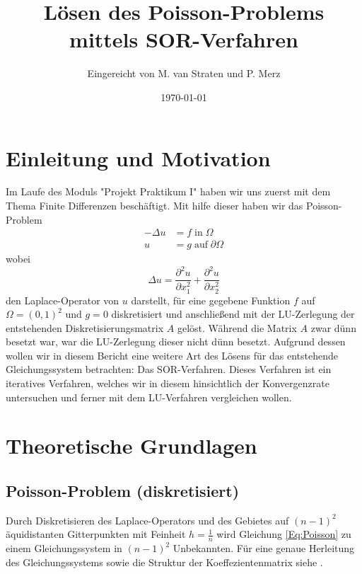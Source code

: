 \documentclass{scrartcl}
\title{Lösen des Poisson-Problems mittels SOR-Verfahren}
\author{%
  Eingereicht von M. van Straten und P. Merz
}
\date{\today}
\theoremstyle{definition}
\begin{document}
\maketitle
\tableofcontents
\cleardoublepage%

\section{Einleitung und Motivation}
Im Laufe des Moduls "Projekt Praktikum I" haben wir uns zuerst mit dem Thema
Finite Differenzen beschäftigt. Mit hilfe dieser haben wir das Poisson-Problem
\begin{align}\label{Eq:Poisson}
    -\Delta u & = f \; \text{in} \; \Omega           \\
    u         & = g \; \text{auf} \; \partial \Omega
\end{align}
wobei
\begin{equation*}
    \Delta u = \frac{\partial^2 u}{\partial x_1^2} + \frac{\partial^2 u}{\partial x_2^2}
\end{equation*}
den Laplace-Operator von \(u\) darstellt, für eine gegebene Funktion \(f\)
auf \(\Omega = {(0, 1)}^2\) und \(g = 0\) diskretisiert und anschließend mit
der LU-Zerlegung der entstehenden Diskretisierungsmatrix \(A\) gelöst. Während die Matrix \(A\) zwar dünn besetzt war,
war die LU-Zerlegung dieser nicht dünn besetzt. Aufgrund dessen wollen wir in diesem Bericht eine weitere Art des
Lösens für das entstehende Gleichungssystem betrachten: Das SOR-Verfahren. Dieses Verfahren ist ein iteratives Verfahren, welches wir in diesem hinsichtlich der Konvergenzrate untersuchen und ferner mit dem LU-Verfahren vergleichen wollen.

\section{Theoretische Grundlagen}

\subsection{Poisson-Problem (diskretisiert)}
Durch Diskretisieren des Laplace-Operators und des Gebietes auf \((n-1)^2\)
äquidistanten Gitterpunkten mit Feinheit \(h=\frac{1}{n}\) wird Gleichung \ref{Eq:Poisson} zu einem Gleichungssystem in \((n-1)^2\) Unbekannten. Für eine genaue Herleitung des Gleichungssystems sowie die Struktur der Koeffezientenmatrix siehe \cite{HandoutLU}.
\end{document}
